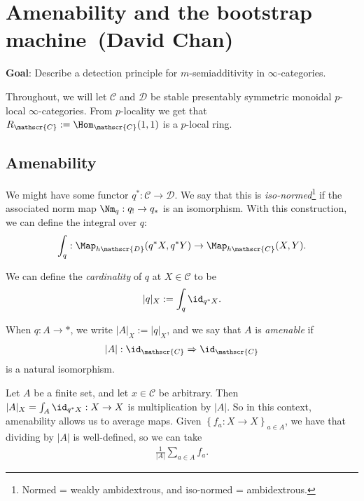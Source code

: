 \renewcommand{\thespeaker}{David Chan}
\renewcommand{\thetitle}{Amenability and the bootstrap machine}
\section{\thetitle~(\thespeaker)}

\textbf{Goal}: Describe a detection principle for $m$-semiadditivity in $\infty$-categories.

Throughout, we will let $\mathscr{C}$ and $\mathscr{D}$ be stable presentably symmetric monoidal $p$-local $\infty$-categories. From $p$-locality we get that $R_\mathscr{C} := \Hom_\mathscr{C}(1,1)$ is a $p$-local ring.

\subsection{Amenability}

We might have some functor $q^\ast : \mathscr{C} \to \mathscr{D}$. We say that this is \textit{iso-normed}\footnote{Normed = weakly ambidextrous, and iso-normed = ambidextrous.} if the associated norm map $\Nm_q : q_! \to q_\ast$ is an isomorphism. With this construction, we can define the integral over $q$:
\begin{align*}
    \int_q : \Map_{h \mathscr{D}} (q^\ast X, q^\ast Y) \to \Map_{h\mathscr{C}}(X,Y).
\end{align*}

We can define the \textit{cardinality} of $q$ at $X\in \mathscr{C}$ to be
\begin{align*}
    |q|_X := \int_q \id_{q^\ast X}.
\end{align*}

When $q: A \to \ast$, we write $|A|_X := |q|_X$, and we say that $A$ is \textit{amenable} if
\begin{align*}
    |A| : \id_\mathscr{C} \Rightarrow \id_\mathscr{C}
\end{align*}
is a natural isomorphism.

\begin{example} Let $A$ be a finite set, and let $x\in \mathscr{C}$ be arbitrary. Then $|A|_X = \int_A \id_{q^\ast X} : X \to X$ is multiplication by $|A|$. So in this context, amenability allows us to average maps. Given $\left\{ f_a : X \to X \right\}_{a\in A}$, we have that dividing by $|A|$ is well-defined, so we can take
\begin{align*}
    \frac{1}{|A|} \sum_{a\in A} f_a.
\end{align*}
\end{example}


